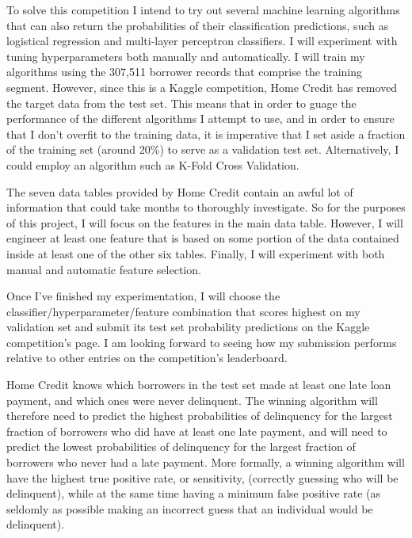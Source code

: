 \documentclass[12pt, letterpaper]{article}
\begin{document}
To solve this competition I intend to try out several machine learning algorithms that can also return the probabilities of their classification predictions, such as logistical regression and multi-layer perceptron classifiers. I will experiment with tuning hyperparameters both manually and automatically. I will train my algorithms using the 307,511 borrower records that comprise the training segment. However, since this is a Kaggle competition, Home Credit has removed the target data from the test set. This means that in order to guage the performance of the different algorithms I attempt to use, and in order to ensure that I don't overfit to the training data, it is imperative that I set aside a fraction of the training set (around 20\%) to serve as a validation test set. Alternatively, I could employ an algorithm such as K-Fold Cross Validation.

The seven data tables provided by Home Credit contain an awful lot of information that could take months to thoroughly investigate. So for the purposes of this project, I will focus on the features in the main data table. However, I will engineer at least one feature that is based on some portion of the data contained inside at least one of the other six tables. Finally, I will experiment with both manual and automatic feature selection.

Once I've finished my experimentation, I will choose the classifier/hyperparameter/feature combination that scores highest on my validation set and submit its test set probability predictions on the Kaggle competition's page. I am looking forward to seeing how my submission performs relative to other entries on the competition's leaderboard.

Home Credit knows which borrowers in the test set made at least one late loan payment, and which ones were never delinquent. The winning algorithm will therefore need to predict the highest probabilities of delinquency for the largest fraction of borrowers who did have at least one late payment, and will need to predict the lowest probabilities of delinquency for the largest fraction of borrowers who never had a late payment. More formally, a winning algorithm will have the highest true positive rate, or sensitivity, (correctly guessing who will be delinquent), while at the same time having a minimum false positive rate (as seldomly as possible making an incorrect guess that an individual would be delinquent).
\end{document}
